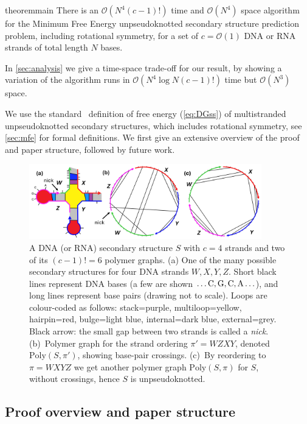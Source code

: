 \documentclass[11pt,letterpaper]{article}  \usepackage[margin=1in]{geometry}
\theoremstyle{definition}  \newtheorem{Definition}[theorem]{Definition}
\newcommand{\PolySpi}{\ensuremath{\mathrm{Poly}(S,\pi)}\xspace}
\newcommand{\PolySpiPrime}{\ensuremath{\mathrm{Poly}(S,\pi')}\xspace}
\begin{document}
\begin{restatable}{theorem}{main} 
	\label{thm:main}
	There is an $\mathcal{O}(N^4(c-1)!)$ time and $\mathcal{O}(N^4)$ space algorithm for the 
	Minimum Free Energy unpseudoknotted secondary structure prediction problem, including rotational symmetry, 
	for a set of $c = \mathcal{O}(1)$ DNA or RNA strands of  total length  $N$ bases. 
\end{restatable}

In \cref{sec:analysis} we give a time-space trade-off for our result, by showing a variation of the algorithm runs in $\mathcal{O}(N^4 \log N (c-1)!)$ time but $\mathcal{O}(N^3)$ space.  


We use the standard~\cite{dirks2007thermodynamic} definition of free energy (\cref{eq:DGss}) of multistranded unpseudoknotted secondary structures, which includes rotational symmetry, see \cref{sec:mfe} for formal definitions.  
We first give an extensive overview of the proof and paper structure, followed by future work. 


\begin{figure}[t]
	\centering\includegraphics[width=0.9\textwidth]{figures/ss.jpg}
	\caption{
		A  DNA (or RNA) secondary structure $S$ with $c=4$ strands and two of its $(c-1)!=6$ polymer graphs. 
		(a) One of the many possible secondary structures for four DNA strands $W,X,Y,Z$. 
		Short black lines represent DNA bases (a few are shown $\ldots \mathrm{C}, \mathrm{G}, \mathrm{C}, \mathrm{A} \ldots$), and long lines represent base pairs (drawing not to scale). 
		Loops are colour-coded as follows:  stack=purple, multiloop=yellow, hairpin=red, bulge=light blue, internal=dark blue, external=grey.    
		Black arrow: the small gap between two strands is called a {\em nick}. 
		(b)~Polymer graph for the strand ordering $\pi' = WZXY$, denoted \PolySpiPrime, showing base-pair crossings.
		(c)~By  reordering to $\pi = WXYZ$ we get another polymer graph \PolySpi for $S$, without crossings, hence  $S$ is unpseudoknotted. 
	}
	\label{fig:sec struct}
	
\end{figure}

\subsection{Proof overview and paper structure}\label{sec:intuition}
\end{document}
